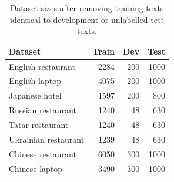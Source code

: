 \begin{table}[t]
\centering\small
\caption{Dataset sizes after removing training texts identical to development or unlabelled test texts.}\label{tab:data}
\begin{tabular}{lrrr}
\toprule
Dataset & Train & Dev & Test \\
\midrule
English restaurant & 2284 & 200 & 1000 \\
English laptop & 4075 & 200 & 1000 \\
Japanese hotel & 1597 & 200 & 800 \\
Russian restaurant & 1240 & 48 & 630 \\
Tatar restaurant & 1240 & 48 & 630 \\
Ukrainian restaurant & 1239 & 48 & 630 \\
Chinese restaurant & 6050 & 300 & 1000 \\
Chinese laptop & 3490 & 300 & 1000 \\
\bottomrule
\end{tabular}
\end{table}

